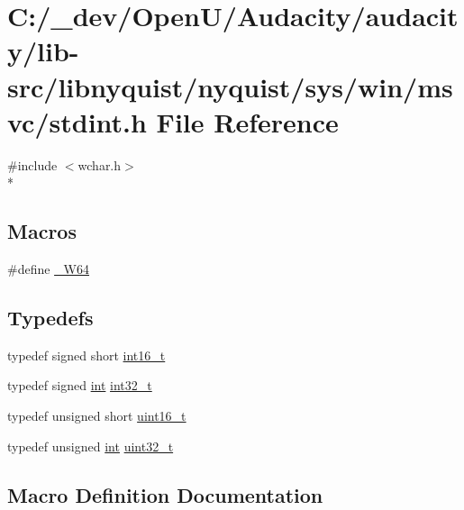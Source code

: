 \hypertarget{lib-src_2libnyquist_2nyquist_2sys_2win_2msvc_2stdint_8h}{}\section{C\+:/\+\_\+dev/\+Open\+U/\+Audacity/audacity/lib-\/src/libnyquist/nyquist/sys/win/msvc/stdint.h File Reference}
\label{lib-src_2libnyquist_2nyquist_2sys_2win_2msvc_2stdint_8h}
{\ttfamily \#include $<$wchar.\+h$>$}\\*
\subsection*{Macros}
\begin{DoxyCompactItemize}
\item 
\#define \hyperlink{lib-src_2libnyquist_2nyquist_2sys_2win_2msvc_2stdint_8h_a3730e9bd68460c3bea497352ee69b9ae}{\+\_\+\+W64}
\end{DoxyCompactItemize}
\subsection*{Typedefs}
\begin{DoxyCompactItemize}
\item 
typedef signed short \hyperlink{lib-src_2libnyquist_2nyquist_2sys_2win_2msvc_2stdint_8h_a269259c924dce846340ddbb810db2e3c}{int16\+\_\+t}
\item 
typedef signed \hyperlink{xmltok_8h_a5a0d4a5641ce434f1d23533f2b2e6653}{int} \hyperlink{lib-src_2libnyquist_2nyquist_2sys_2win_2msvc_2stdint_8h_ab1967d8591af1a4e48c37fd2b0f184d0}{int32\+\_\+t}
\item 
typedef unsigned short \hyperlink{lib-src_2libnyquist_2nyquist_2sys_2win_2msvc_2stdint_8h_a273cf69d639a59973b6019625df33e30}{uint16\+\_\+t}
\item 
typedef unsigned \hyperlink{xmltok_8h_a5a0d4a5641ce434f1d23533f2b2e6653}{int} \hyperlink{lib-src_2libnyquist_2nyquist_2sys_2win_2msvc_2stdint_8h_a435d1572bf3f880d55459d9805097f62}{uint32\+\_\+t}
\end{DoxyCompactItemize}


\subsection{Macro Definition Documentation}
